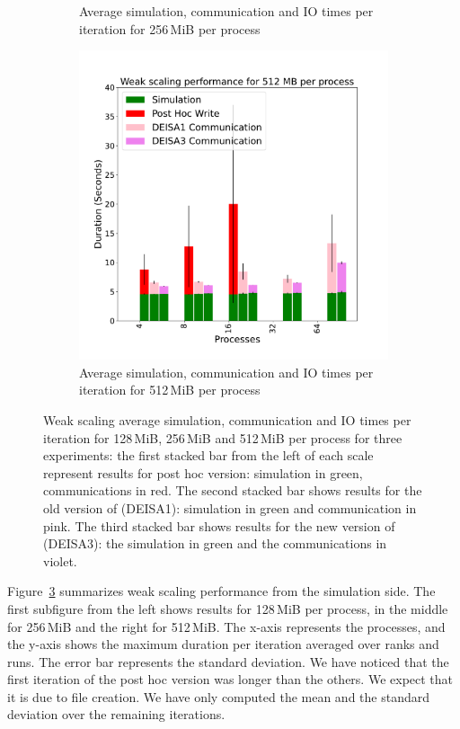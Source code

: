 \begin{figure}[h!]
\begin{subfigure}[b]{0.3\textwidth}
         \caption{Average simulation, communication and IO times per iteration for 256\,MiB per process}
         \label{fig:X256_1_3_p}
     \end{subfigure}
     \hfill
     \begin{subfigure}[b]{0.3\textwidth}
         \centering
         \includegraphics[width=\textwidth, height=\textwidth]{figures/512MB_1vs3vspost1vspost2.pdf}
         \caption{Average simulation, communication and IO times per iteration for 512\,MiB per process}
         \label{fig:X512_1_3_p}
     \end{subfigure}
        \caption{Weak scaling average simulation, communication and IO times per iteration for 128\,MiB, 256\,MiB and 512\,MiB per process for three experiments: the first stacked bar from the left of each scale represent results for post hoc version: simulation in green, communications in red. The second stacked bar shows results for the old version of \deisa (DEISA1): simulation in green and communication in pink. The third stacked bar shows results for the new version of \deisa (DEISA3): the simulation in green and the communications in violet.}
        \label{fig:perfX4}
\end{figure}

Figure~\ref{fig:perfX4} summarizes weak scaling performance from the simulation side. The first subfigure from the left shows results for 128\,MiB per process, in the middle for 256\,MiB and the right for 512\,MiB. 
The x-axis represents the processes, and the y-axis shows the maximum duration per iteration averaged over ranks and runs. The error bar represents the standard deviation. We have noticed that the first iteration of the post hoc version was longer than the others. We expect that it is due to file creation. We have only computed the mean and the standard deviation over the remaining iterations. 

